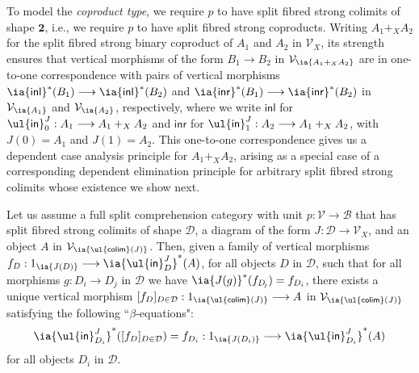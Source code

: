 To model the \emph{coproduct type}, we require $p$ to have split fibred strong colimits of shape $\mathbf{2}$, i.e., we require $p$ to have split fibred strong  coproducts. 
Writing ${A_1 +_X A_2}$ for the split fibred strong binary coproduct of $A_1$ and $A_2$ in $\mathcal{V}_X$, its strength ensures that vertical morphisms of the form $B_1 \longrightarrow B_2$ in $\mathcal{V}_{\ia {A_1 +_X A_2}}$ are in one-to-one \linebreak correspondence with pairs of vertical morphisms $\ia {\mathsf{inl}} ^*(B_1) \longrightarrow \ia {\mathsf{inl}} ^*(B_2)$ and \linebreak $\ia {\mathsf{inr}} ^*(B_1) \longrightarrow \ia {\mathsf{inr}} ^*(B_2)$ in $\mathcal{V}_{\ia {A_1}}$ and $\mathcal{V}_{\ia {A_2}}$, respectively, where we write \linebreak $\mathsf{inl}$ for $\mathsf{\ul{in}}^J_0 : A_1 \longrightarrow A_1 +_X A_2$ and $\mathsf{inr}$ for $\mathsf{\ul{in}}^J_1 : A_2 \longrightarrow A_1 +_X A_2$, with $J(0) = A_1$ and \linebreak $J(1) = A_2$.
This one-to-one correspondence gives us a dependent case analysis principle for $A_1 +_X A_2$, arising as a special case of a corresponding dependent elimination principle for arbitrary split fibred strong colimits whose existence we show next.


\begin{proposition}
\label{prop:indexedelimcolimits}
Let us assume a full split comprehension category with unit \linebreak $p : \mathcal{V} \longrightarrow \mathcal{B}$ that has split fibred strong colimits of shape $\mathcal{D}$, a diagram of the form \linebreak $J : \mathcal{D} \longrightarrow \mathcal{V}_X$, and an object $A$ in $\mathcal{V}_{\ia {\mathsf{\ul{colim}}(J)}}$. Then, given a family of vertical morphisms $f_{D} : 1_{\ia {J(D)}} \longrightarrow \ia {\mathsf{\ul{in}}^{J}_D} ^*(A)$, for all objects $D$ in $\mathcal{D}$, such that for all morphisms \linebreak$g : D_i \longrightarrow D_{\!j}$ in $\mathcal{D}$ we have $\ia {J(g)} ^*(f_{D_{\!j}}) = f_{D_i}$, there exists a unique vertical morphism $[f_D]_{D \in \mathcal{D}} : 1_{\ia {\mathsf{\ul{colim}}(J)}} \longrightarrow A$ in $\mathcal{V}_{\ia {\mathsf{\ul{colim}}(J)}}$ satisfying the following ``$\beta$-equations":
\[
\ia {\mathsf{\ul{in}}^{J}_{D_i}}^*([f_D]_{D \in \mathcal{D}}) = f_{D_i}  : 1_{\ia {J(D_i)}} \longrightarrow \ia {\mathsf{\ul{in}}^{J}_{D_i}} ^*(A)
\]
for all objects $D_i$ in $\mathcal{D}$.
\end{proposition}

